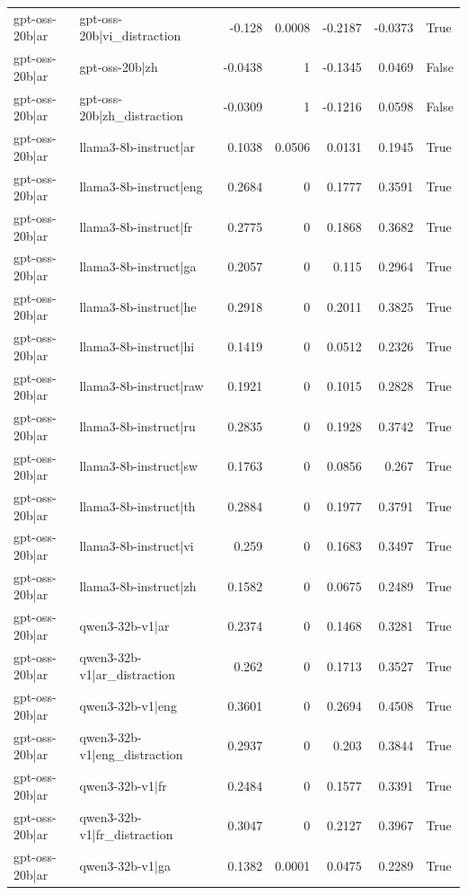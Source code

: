 \begin{table}
\begin{tabular}{l l r r r r l}
gpt-oss-20b|ar & gpt-oss-20b|vi_distraction & -0.128 & 0.0008 & -0.2187 & -0.0373 & True \\
gpt-oss-20b|ar & gpt-oss-20b|zh & -0.0438 & 1 & -0.1345 & 0.0469 & False \\
gpt-oss-20b|ar & gpt-oss-20b|zh_distraction & -0.0309 & 1 & -0.1216 & 0.0598 & False \\
gpt-oss-20b|ar & llama3-8b-instruct|ar & 0.1038 & 0.0506 & 0.0131 & 0.1945 & True \\
gpt-oss-20b|ar & llama3-8b-instruct|eng & 0.2684 & 0 & 0.1777 & 0.3591 & True \\
gpt-oss-20b|ar & llama3-8b-instruct|fr & 0.2775 & 0 & 0.1868 & 0.3682 & True \\
gpt-oss-20b|ar & llama3-8b-instruct|ga & 0.2057 & 0 & 0.115 & 0.2964 & True \\
gpt-oss-20b|ar & llama3-8b-instruct|he & 0.2918 & 0 & 0.2011 & 0.3825 & True \\
gpt-oss-20b|ar & llama3-8b-instruct|hi & 0.1419 & 0 & 0.0512 & 0.2326 & True \\
gpt-oss-20b|ar & llama3-8b-instruct|raw & 0.1921 & 0 & 0.1015 & 0.2828 & True \\
gpt-oss-20b|ar & llama3-8b-instruct|ru & 0.2835 & 0 & 0.1928 & 0.3742 & True \\
gpt-oss-20b|ar & llama3-8b-instruct|sw & 0.1763 & 0 & 0.0856 & 0.267 & True \\
gpt-oss-20b|ar & llama3-8b-instruct|th & 0.2884 & 0 & 0.1977 & 0.3791 & True \\
gpt-oss-20b|ar & llama3-8b-instruct|vi & 0.259 & 0 & 0.1683 & 0.3497 & True \\
gpt-oss-20b|ar & llama3-8b-instruct|zh & 0.1582 & 0 & 0.0675 & 0.2489 & True \\
gpt-oss-20b|ar & qwen3-32b-v1|ar & 0.2374 & 0 & 0.1468 & 0.3281 & True \\
gpt-oss-20b|ar & qwen3-32b-v1|ar_distraction & 0.262 & 0 & 0.1713 & 0.3527 & True \\
gpt-oss-20b|ar & qwen3-32b-v1|eng & 0.3601 & 0 & 0.2694 & 0.4508 & True \\
gpt-oss-20b|ar & qwen3-32b-v1|eng_distraction & 0.2937 & 0 & 0.203 & 0.3844 & True \\
gpt-oss-20b|ar & qwen3-32b-v1|fr & 0.2484 & 0 & 0.1577 & 0.3391 & True \\
gpt-oss-20b|ar & qwen3-32b-v1|fr_distraction & 0.3047 & 0 & 0.2127 & 0.3967 & True \\
gpt-oss-20b|ar & qwen3-32b-v1|ga & 0.1382 & 0.0001 & 0.0475 & 0.2289 & True \\

\end{tabular}
\end{table}
